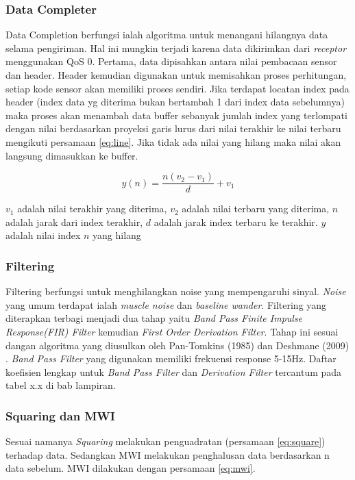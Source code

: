 \subsubsection{Data Completer}
Data Completion berfungsi ialah algoritma untuk menangani hilangnya data selama pengiriman. Hal ini mungkin terjadi karena data dikirimkan dari \textit{receptor} menggunakan QoS 0. Pertama, data dipisahkan antara nilai pembacaan sensor dan header. Header kemudian digunakan untuk memisahkan proses perhitungan, setiap kode sensor akan memiliki proses sendiri. Jika terdapat locatan index pada header (index data yg diterima bukan bertambah 1 dari index data sebelumnya) maka proses akan menambah data buffer sebanyak jumlah index yang terlompati dengan nilai berdasarkan proyeksi garis lurus dari nilai terakhir ke nilai terbaru mengikuti persamaan \ref{eq:line}. Jika tidak ada nilai yang hilang maka nilai akan langsung dimasukkan ke buffer.

\begin{equation}
y(n) = \dfrac{n (v_{2} - v_{1})}{d} + v_{1}
\label{eq:line}
\end{equation}

$v_{1}$ adalah nilai terakhir yang diterima, $v_{2}$ adalah nilai terbaru yang diterima, $n$ adalah jarak dari index terakhir, $d$ adalah jarak index terbaru ke terakhir. $y$ adalah nilai index $n$ yang hilang

\subsubsection{Filtering}
Filtering berfungsi untuk menghilangkan noise yang mempengaruhi sinyal. \textit{Noise} yang umum terdapat ialah \textit{muscle noise} dan \textit{baseline wander}. Filtering yang diterapkan terbagi menjadi dua tahap yaitu \textit{Band Pass Finite Impulse Response(FIR) Filter} kemudian \textit{First Order Derivation Filter}. Tahap ini sesuai dangan algoritma yang diusulkan oleh Pan-Tomkins (1985)\cite{pantom} dan Deshmane (2009) \cite{deshmane}. \textit{Band Pass Filter} yang digunakan memiliki frekuensi response 5-15Hz. Daftar koefisien lengkap untuk \textit{Band Pass Filter} dan \textit{Derivation Filter} tercantum pada tabel x.x di bab lampiran.

\subsubsection{Squaring dan MWI}
Sesuai namanya \textit{Squaring} melakukan penguadratan (persamaan \ref{eq:square}) terhadap data. Sedangkan MWI melakukan penghalusan data berdasarkan n data sebelum. MWI dilakukan dengan persamaan \ref{eq:mwi}.

